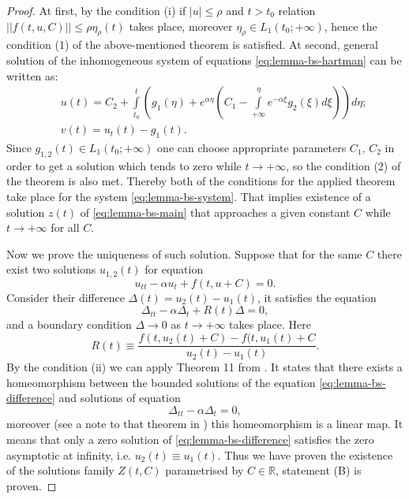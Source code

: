 \begin{proof}
	At first, by the condition (i) if $|u| \le \rho$ and $t > t_0$ relation $||f(t, u, C)|| \le \rho \eta_{\rho} (t)$ takes place, moreover $\eta_{\rho} \in L_1(t_0; +\infty)$, hence the condition (1) of the above-mentioned theorem is satisfied.
	At second, general solution of the inhomogeneous system of equations \eqref{eq:lemma-bs-hartman} can be written as:
	\begin{eqnarray}
		&& u(t) = C_2 + \int \limits_{t_0}^{t} \left( g_1(\eta) + e^{\alpha \eta} \left( C_1 - \int \limits_{+\infty}^{\eta} e^{-\alpha \xi} g_2(\xi) d\xi \right) \right) d\eta; \\
		&& v(t) = u_t(t) - g_1(t).
	\end{eqnarray}
	Since $g_{1,2}(t) \in L_1(t_0; +\infty)$ one can choose appropriate parameters $C_1$, $C_2$ in order to get a solution which tends to zero while $t \to +\infty$, so the condition (2) of the theorem is also met.
	Thereby both of the conditions for the applied theorem take place for the system \eqref{eq:lemma-bs-system}.
	That implies existence of a solution $z(t)$ of \eqref{eq:lemma-bs-main} that approaches a given constant $C$ while $t \to +\infty$ for all $C$.
	
	Now we prove the uniqueness of such solution.
	Suppose that for the same $C$ there exist two solutions $u_{1,2}(t)$ for equation
	\begin{equation}
		u_{tt} - \alpha u_t + f(t, u + C) = 0.
		\label{eq:lemma-bs-u}
	\end{equation}
	Consider their difference $\Delta(t) = u_2(t) - u_1(t)$, it satisfies the equation
	\begin{equation}
		\Delta_{tt} - \alpha \Delta_t + R(t) \Delta = 0,
		\label{eq:lemma-bs-difference}
	\end{equation}
	and a boundary condition $\Delta \to 0$ as $t \to +\infty$ takes place.
	Here
	\begin{equation}
		R(t) \equiv \dfrac{f(t, u_2(t) +C) - f(t, u_1(t) + C}{u_2(t) - u_1(t)}.
	\end{equation}
	By the condition (ii) we can apply Theorem 11 from \cite[Chapter 3]{Coppel}.
	It states that there exists a homeomorphism between the bounded solutions of the equation \eqref{eq:lemma-bs-difference} and solutions of equation
	\begin{equation}
		\Delta_{tt} - \alpha \Delta_t = 0,
	\end{equation}
	moreover (see a note to that theorem in \cite{Coppel}) this homeomorphism is a linear map.
	It means that only a zero solution of \eqref{eq:lemma-bs-difference} satisfies the zero asymptotic at infinity, i.e. $u_2(t) \equiv u_1(t)$.
	Thus we have proven the existence of the solutions family $Z(t, C)$ parametrised by $C \in \mathbb{R}$, statement (B) is proven.
	

\end{proof}
